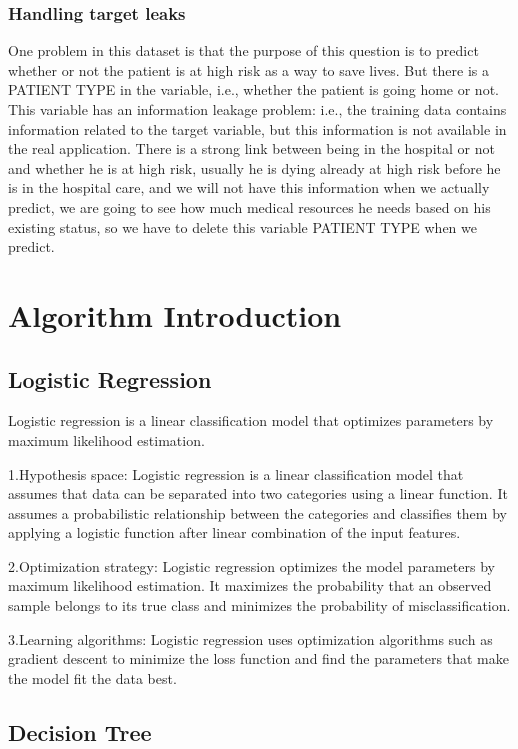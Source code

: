 \documentclass[
  journal=medium,
  manuscript=Report,
  year=2023,
  volume=37,
]{cup-journal}
\begin{document}
\subsubsection{Handling target leaks}

One problem in this dataset is that the purpose of this question is to predict whether or not the patient is at high risk as a way to save lives. But there is a PATIENT TYPE in the variable, i.e., whether the patient is going home or not. This variable has an information leakage problem: i.e., the training data contains information related to the target variable, but this information is not available in the real application. There is a strong link between being in the hospital or not and whether he is at high risk, usually he is dying already at high risk before he is in the hospital care, and we will not have this information when we actually predict, we are going to see how much medical resources he needs based on his existing status, so we have to delete this variable PATIENT TYPE when we predict.

\section{Algorithm Introduction}

\subsection{Logistic Regression}

Logistic regression is a linear classification model that optimizes parameters by maximum likelihood estimation.

1.Hypothesis space: Logistic regression is a linear classification model that assumes that data can be separated into two categories using a linear function. It assumes a probabilistic relationship between the categories and classifies them by applying a logistic function after linear combination of the input features.

2.Optimization strategy: Logistic regression optimizes the model parameters by maximum likelihood estimation. It maximizes the probability that an observed sample belongs to its true class and minimizes the probability of misclassification.

3.Learning algorithms: Logistic regression uses optimization algorithms such as gradient descent to minimize the loss function and find the parameters that make the model fit the data best.

\subsection{Decision Tree}
\end{document}
